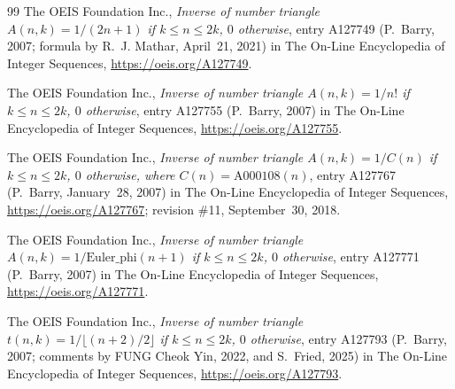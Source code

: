 \documentclass[11pt]{amsart}
\theoremstyle{plain}
\theoremstyle{definition}
\begin{document}
{\begin{thebibliography}{99}
The OEIS Foundation Inc., \emph{Inverse of number triangle $A(n,k)=1/(2n+1)$ if $k\le n\le 2k$, $0$ otherwise}, entry A127749 (P.~Barry, 2007; formula by R.~J. Mathar, April~21, 2021) in The On-Line Encyclopedia of Integer Sequences, \url{https://oeis.org/A127749}.

The OEIS Foundation Inc., \emph{Inverse of number triangle $A(n,k)=1/n!$ if $k\le n\le 2k$, $0$ otherwise}, entry A127755 (P.~Barry, 2007) in The On-Line Encyclopedia of Integer Sequences, \url{https://oeis.org/A127755}.

The OEIS Foundation Inc., \emph{Inverse of number triangle $A(n,k)=1/C(n)$ if $k\le n\le 2k$, $0$ otherwise, where $C(n)=\mathrm{A000108}(n)$}, entry A127767 (P.~Barry, January~28, 2007) in The On-Line Encyclopedia of Integer Sequences, \url{https://oeis.org/A127767}; revision \#11, September~30, 2018.

The OEIS Foundation Inc., \emph{Inverse of number triangle $A(n,k)=1/\mathrm{Euler\_phi}(n+1)$ if $k\le n\le 2k$, $0$ otherwise}, entry A127771 (P.~Barry, 2007) in The On-Line Encyclopedia of Integer Sequences, \url{https://oeis.org/A127771}.

The OEIS Foundation Inc., \emph{Inverse of number triangle $t(n,k)=1/\lfloor (n+2)/2\rfloor$ if $k\le n\le 2k$, $0$ otherwise}, entry A127793 (P.~Barry, 2007; comments by FUNG Cheok Yin, 2022, and S.~Fried, 2025) in The On-Line Encyclopedia of Integer Sequences, \url{https://oeis.org/A127793}.

\end{thebibliography}
}
\end{document}
